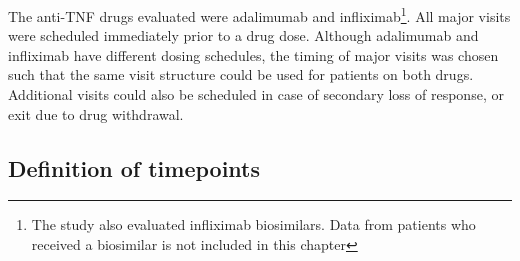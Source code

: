 \begin{outline}
The anti-\gls{TNF} drugs evaluated were adalimumab and infliximab\footnote{The study also evaluated infliximab biosimilars. Data from patients who received a biosimilar is not included in this chapter}.
All major visits were scheduled immediately prior to a drug dose.
Although adalimumab and infliximab have different dosing schedules, the timing of major visits was chosen such that the same visit structure could be used for patients on both drugs.
Additional visits could also be scheduled in case of secondary loss of response, or exit due to drug withdrawal.


\subsection{Definition of timepoints}
\label{subsubsec:multiPANTS_timepoints_def}


\end{outline}
